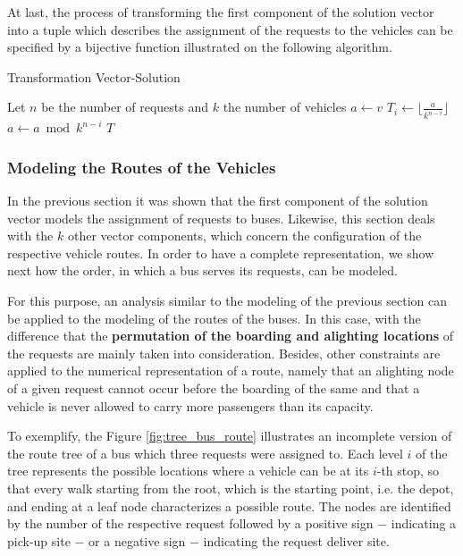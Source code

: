 \documentclass[tuberlin,cic,tc,openright,english,noabntcite,oneside]{iiufrgs}
\begin{document}
At last, the process of transforming the first component of the solution vector into a tuple which describes the assignment of the requests to the vehicles can be specified by a bijective function illustrated on the following algorithm.
\begin{algorithm}[H]
\caption{Transformation Vector-Solution}
\begin{algorithmic}
\State Let $n$ be the number of requests and $k$ the number of vehicles
\State $a \gets v$
	\State $\displaystyle T_{i} \gets \lfloor \frac{a}{k^{n-i}} \rfloor$
	\State $a \gets a \bmod k^{n-i}$
\EndFor
\State \Return $T$
\EndFunction
\end{algorithmic}
\end{algorithm}

\subsubsection{Modeling the Routes of the Vehicles}\label{sec:model-routes}
In the previous section it was shown that the first component of the solution vector models the assignment of requests to buses. Likewise, this section deals with the $k$ other vector components, which concern the configuration of the respective vehicle routes. In order to have a complete representation, we show next how the order, in which a bus serves its requests, can be modeled.

For this purpose, an analysis similar to the modeling of the previous section can be applied to the modeling of the routes of the buses. In this case, with the difference that the \textbf{permutation of the boarding and alighting locations} of the requests are mainly taken into consideration. Besides, other constraints are applied to the numerical representation of a route, namely that an alighting node of a given request cannot occur before the boarding of the same and that a vehicle is never allowed to carry more passengers than its capacity.

To exemplify, the Figure \ref{fig:tree_bus_route} illustrates an incomplete version of the route tree of a bus which three requests were assigned to. Each level $i$ of the tree represents the possible locations where a vehicle can be at its $i$-th stop, so that every walk starting from the root, which is the starting point, i.e. the depot, and ending at a leaf node characterizes a possible route. The nodes are identified by the number of the respective request followed by a positive sign $-$ indicating a pick-up site $-$ or a negative sign $-$ indicating the request deliver site.
\end{document}
